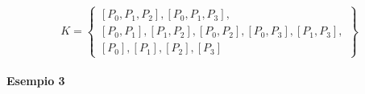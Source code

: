\documentclass[a4paper]{report}
\begin{document}
\[
    K=\left\{
    \begin{array}{ll}
        {[P_0,P_1,P_2],[P_0,P_1,P_3],}                       \\
        {[P_0,P_1],[P_1,P_2],[P_0,P_2],[P_0,P_3],[P_1,P_3],} \\
        {[P_0],[P_1],[P_2],[P_3]}
    \end{array}\right\}
\]
\paragraph{Esempio 3}
\begin{center}



    \begin{tikzpicture}[x=0.75pt,y=0.75pt,yscale=-1,xscale=1]


\end{tikzpicture}
\end{center}
\end{document}
